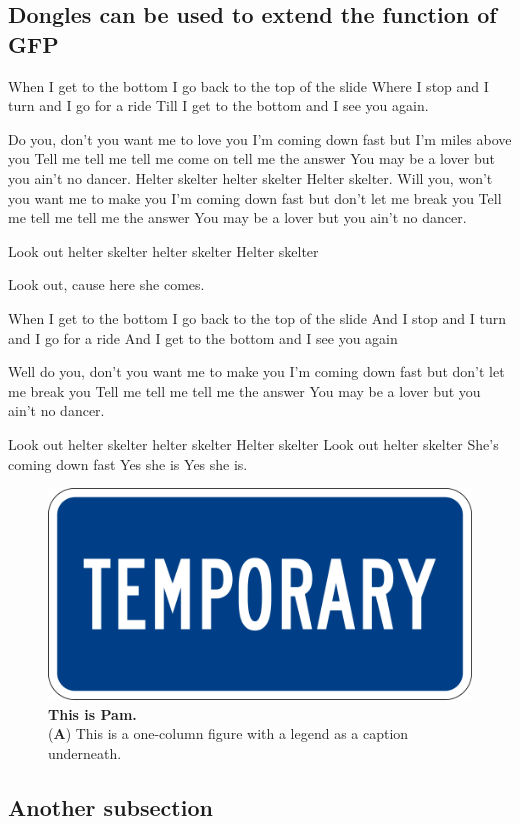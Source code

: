 \documentclass[vruler,JCS]{COB}
\begin{document}
\subsection{Dongles can be used to extend the function of GFP}

When I get to the bottom I go back to the top of the slide
Where I stop and I turn and I go for a ride
Till I get to the bottom and I see you again.

Do you, don't you want me to love you
I'm coming down fast but I’m miles above you
Tell me tell me tell me come on tell me the answer
You may be a lover but you ain't no dancer.
Helter skelter helter skelter
Helter skelter.
Will you, won't you want me to make you
I'm coming down fast but don't let me break you
Tell me tell me tell me the answer
You may be a lover but you ain't no dancer.

Look out helter skelter helter skelter
Helter skelter 

Look out, cause here she comes.

When I get to the bottom I go back to the top of the slide
And I stop and I turn and I go for a ride
And I get to the bottom and I see you again

Well do you, don't you want me to make you
I'm coming down fast but don't let me break you
Tell me tell me tell me the answer
You may be a lover but you ain't no dancer.

Look out helter skelter helter skelter
Helter skelter
Look out helter skelter
She's coming down fast 
Yes she is 
Yes she is.

\begin{figure}
\centering
\includegraphics[width=0.75\linewidth]{Figures/temp.png}
\caption{\textbf{This is Pam.}\\
(\textbf{A}) This is a one-column figure with a legend as a caption underneath.}
\label{fig:sadie}
\end{figure}

\subsection{Another subsection}
\end{document}

